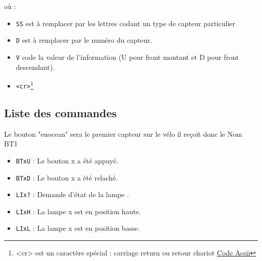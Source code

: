 \documentclass[a4paper, 10pt]{article} %
\begin{document}
où :
\begin{itemize}
  \item \verb|SS| est à remplacer par les lettres codant un type de capteur particulier
  \item \verb|D| est à remplacer par le numéro du capteur.
  \item \verb|V| code la valeur de l'information (U pour front montant et D pour front descendant).  
  \item \verb|<cr>|\footnote{<cr> est un caractère spécial : carriage return ou retour chariot \href{http://fr.wikipedia.org/wiki/American_Standard_Code_for_Information_Interchange}{Code Acsii}}
\end{itemize}

\subsection{Liste des commandes}
Le bouton "enocean" sera le premier capteur sur le vélo il reçoit donc le Nom BT1
\begin{itemize}
	
\item 	\verb|BTxU| : Le bouton \numero x a été appuyé.
	
\item 	\verb|BTxD| : Le bouton \numero x a été relaché.

\item 	\verb|LIx?| : Demande d'état de la lampe \numero.

\item 	\verb|LIxH| : La lampe \numero x est en position haute.

\item 	\verb|LIxL| : La lampe \numero x est en position basse.
\end{itemize}
\end{document}
